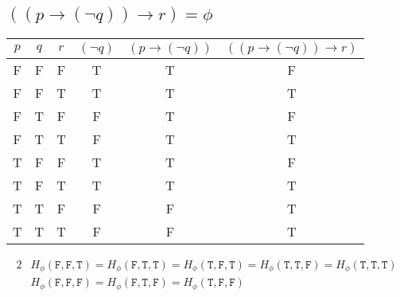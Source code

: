 \documentclass{article}
\begin{document}
\subsection{$((p \to (\lnot q)) \to r) = \phi$}
\begin{center}
    \begin{NiceTabular}{|c|c|c|c|c|c|}
        \hline
        $p$ & $q$ & $r$ & $(\lnot q)$ & $(p \to (\lnot q))$ & $((p \to (\lnot q)) \to r)$\\
        \hline
        \ttfamily F & \ttfamily F & \ttfamily F & \ttfamily T & \ttfamily T & \ttfamily F \\
        \ttfamily F & \ttfamily F & \ttfamily T & \ttfamily T & \ttfamily T & \ttfamily T \\
        \ttfamily F & \ttfamily T & \ttfamily F & \ttfamily F & \ttfamily T & \ttfamily F \\
        \ttfamily F & \ttfamily T & \ttfamily T & \ttfamily F & \ttfamily T & \ttfamily T \\
        \ttfamily T & \ttfamily F & \ttfamily F & \ttfamily T & \ttfamily T & \ttfamily F \\
        \ttfamily T & \ttfamily F & \ttfamily T & \ttfamily T & \ttfamily T & \ttfamily T \\
        \ttfamily T & \ttfamily T & \ttfamily F & \ttfamily F & \ttfamily F & \ttfamily T \\
        \ttfamily T & \ttfamily T & \ttfamily T & \ttfamily F & \ttfamily F & \ttfamily T \\
        \hline
    \end{NiceTabular}
\end{center}
\begin{alignat*}{2}
    & H_{\phi}(\mathtt{F}, \mathtt{F}, \mathtt{T}) = H_{\phi}(\mathtt{F}, \mathtt{T}, \mathtt{T}) = H_{\phi}(\mathtt{T}, \mathtt{F}, \mathtt{T}) = H_{\phi}(\mathtt{T}, \mathtt{T}, \mathtt{F}) = H_{\phi}(\mathtt{T}, \mathtt{T}, \mathtt{T})\\
    &H_{\phi}(\mathtt{F}, \mathtt{F}, \mathtt{F}) = H_{\phi}(\mathtt{F}, \mathtt{T}, \mathtt{F}) = H_{\phi}(\mathtt{T}, \mathtt{F}, \mathtt{F})
\end{alignat*}
\end{document}
